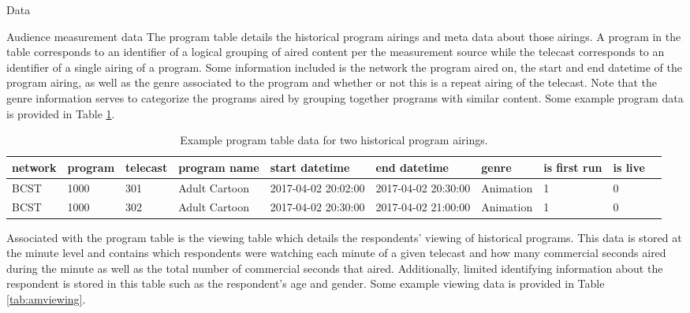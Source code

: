 \begin{chapter}{Data}
\begin{section}{Audience measurement data}
  The program table details the historical program airings and meta data about those airings.
  A program in the table corresponds to an identifier of a logical grouping of
  aired content per the measurement source while the telecast corresponds
  to an identifier of a single airing of a program.
  Some information included is the network the program aired on, the start and end datetime of the
  program airing, as well as the genre associated to the program and whether or not this is a repeat airing of the telecast.
  Note that the genre information serves to categorize the programs aired by grouping together
  programs with similar content.
  Some example program data is provided in Table \ref{tab:amprogram}.

  \begin{table}[h!]
    \centering
    \begin{adjustbox}{width=1.1\textwidth,center=\textwidth}
      \large
      \begin{tabular}{llllllllll}
        network & program & telecast & program name & start datetime & end datetime & genre & is first run & is live\\
        \hline
        BCST & 1000 & 301 & Adult Cartoon & 2017-04-02 20:02:00 & 2017-04-02 20:30:00 & Animation & 1 & 0 \\
        BCST & 1000 & 302 & Adult Cartoon & 2017-04-02 20:30:00 & 2017-04-02 21:00:00 & Animation & 1 & 0
      \end{tabular}
    \end{adjustbox}
    \caption{Example program table data for two historical program airings.}\label{tab:amprogram}
  \end{table}

  Associated with the program table is the viewing table which details the respondents' viewing of
  historical programs. This data is stored at the minute level and contains
  which respondents were watching each minute of a given telecast and how many commercial seconds aired
  during the minute as well as the total number of commercial seconds that aired.
  Additionally, limited identifying information about the
  respondent is stored in this table such as the respondent's age and gender.
  Some example viewing data is provided in Table \ref{tab:amviewing}.


\end{section}
\end{chapter}
